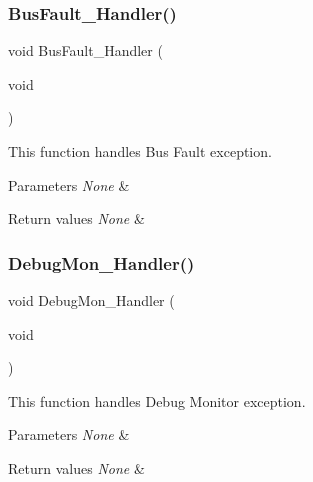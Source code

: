 \subsubsection{\texorpdfstring{Bus\+Fault\+\_\+\+Handler()}{BusFault\_Handler()}}
{\footnotesize\ttfamily void Bus\+Fault\+\_\+\+Handler (\begin{DoxyParamCaption}\item[{void}]{ }\end{DoxyParamCaption})}



This function handles Bus Fault exception. 


\begin{DoxyParams}{Parameters}
{\em None} & \\
\hline
\end{DoxyParams}

\begin{DoxyRetVals}{Return values}
{\em None} & \\
\hline
\end{DoxyRetVals}
\mbox{\label{group___templates_gadbdfb05858cc36fc520974df37ec3cb0}} 
\subsubsection{\texorpdfstring{Debug\+Mon\+\_\+\+Handler()}{DebugMon\_Handler()}}
{\footnotesize\ttfamily void Debug\+Mon\+\_\+\+Handler (\begin{DoxyParamCaption}\item[{void}]{ }\end{DoxyParamCaption})}



This function handles Debug Monitor exception. 


\begin{DoxyParams}{Parameters}
{\em None} & \\
\hline
\end{DoxyParams}

\begin{DoxyRetVals}{Return values}
{\em None} & \\
\hline
\end{DoxyRetVals}
\mbox{\label{group___templates_ga2bffc10d5bd4106753b7c30e86903bea}} 
